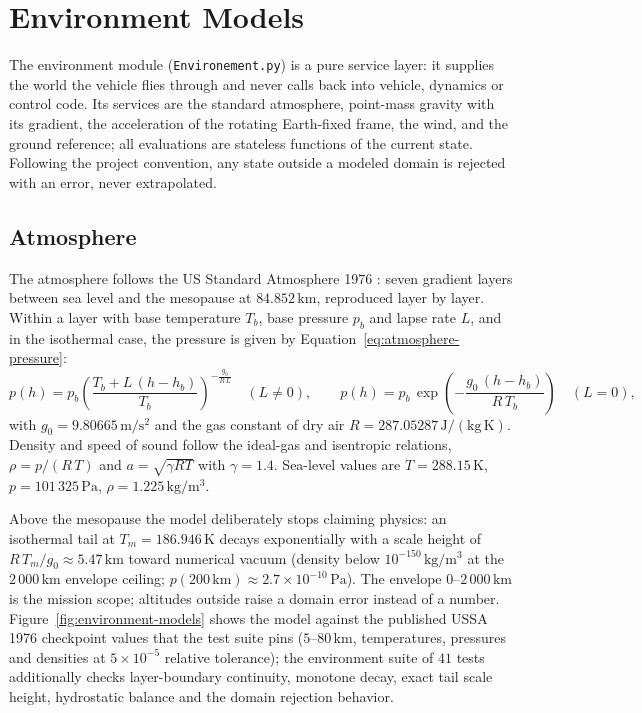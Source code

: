 \section{Environment Models}
\label{sec:environment}

The environment module (\texttt{Environement.py}) is a pure service layer:
it supplies the world the vehicle flies through and never calls back into
vehicle, dynamics or control code. Its services are the standard atmosphere,
point-mass gravity with its gradient, the acceleration of the rotating
Earth-fixed frame, the wind, and the ground reference; all evaluations are
stateless functions of the current state. Following the project convention,
any state outside a modeled domain is rejected with an error, never
extrapolated.

\subsection{Atmosphere}

The atmosphere follows the US Standard Atmosphere 1976 \cite{ussa1976}:
seven gradient layers between sea level and the mesopause at
$84.852\,\mathrm{km}$, reproduced layer by layer. Within a layer with base
temperature $T_b$, base pressure $p_b$ and lapse rate $L$, and in the
isothermal case, the pressure is given by Equation~\eqref{eq:atmosphere-pressure}:
%
\begin{equation}
\label{eq:atmosphere-pressure}
p(h) = p_b \left( \frac{T_b + L\,(h - h_b)}{T_b} \right)^{-\frac{g_0}{R\,L}}
\quad (L \neq 0),
\qquad
p(h) = p_b \, \exp \left( -\frac{g_0\,(h - h_b)}{R\,T_b} \right)
\quad (L = 0),
\end{equation}
%
with $g_0 = 9.80665\,\mathrm{m/s^2}$ and the gas constant of dry air
$R = 287.05287\,\mathrm{J/(kg\,K)}$. Density and speed of sound follow the
ideal-gas and isentropic relations,
$\rho = p/(R\,T)$ and $a = \sqrt{\gamma R T}$ with $\gamma = 1.4$.
Sea-level values are $T = 288.15\,\mathrm{K}$,
$p = 101\,325\,\mathrm{Pa}$, $\rho = 1.225\,\mathrm{kg/m^3}$.

Above the mesopause the model deliberately stops claiming physics: an
isothermal tail at $T_m = 186.946\,\mathrm{K}$ decays exponentially with a
scale height of $R\,T_m/g_0 \approx 5.47\,\mathrm{km}$ toward numerical
vacuum (density below $10^{-150}\,\mathrm{kg/m^3}$ at the
$2\,000\,\mathrm{km}$ envelope ceiling; $p(200\,\mathrm{km}) \approx
2.7\times10^{-10}\,\mathrm{Pa}$). The envelope
$0$--$2\,000\,\mathrm{km}$ is the mission scope; altitudes outside raise a
domain error instead of a number. Figure~\ref{fig:environment-models}
shows the model against the published USSA 1976 checkpoint values that the
test suite pins ($5$--$80\,\mathrm{km}$, temperatures, pressures and
densities at $5\times10^{-5}$ relative tolerance); the environment suite
of $41$ tests additionally checks layer-boundary continuity, monotone
decay, exact tail scale height, hydrostatic balance and the domain
rejection behavior.


